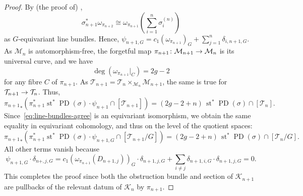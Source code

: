 \documentclass[AHL,Unicode,longabstracts]{cedram}
\makeatletter
\newcommand{\inp}[1]{\left\langle#1\right\rangle }
\newcommand{\inpr}[2]{\langle {#1},{#2} \rangle}
\newcommand{\fcll}[1]{\left[#1\right]}
\newcommand{\cl}{\colon}
\newcommand{\Mbar}{\bar{\mathcal M}}
\newcommand{\bQ}{\mathbb{Q}}
\newcommand{\cK}{\mathcal{K}}
\newcommand{\cM}{\mathcal{M}}
\newcommand{\cT}{\mathcal{T}}
\DeclareMathOperator{\pcd}{PD}
\DeclareMathOperator{\st}{st}
\renewcommand*{\to}{\mathchoice{\longrightarrow}{\rightarrow}{\rightarrow}{\rightarrow}}
\let\save@mathaccent\mathaccent
\newcommand*\if@single[3]{%
  \setbox0\hbox{${\mathaccent"0362{#1}}^H$}%
  \setbox2\hbox{${\mathaccent"0362{\kern0pt#1}}^H$}%
  \ifdim\ht0=\ht2 #3\else #2\fi
  }
\newcommand*\rel@kern[1]{\kern#1\dimexpr\macc@kerna}
\newcommand*\widebar[1]{\@ifnextchar^{{\wide@bar{#1}{0}}}{\wide@bar{#1}{1}}}
\newcommand*\wide@bar[2]{\if@single{#1}{\wide@bar@{#1}{#2}{1}}{\wide@bar@{#1}{#2}{2}}}
\newcommand*\wide@bar@[3]{%
  \begingroup
  \def\mathaccent##1##2{%
    \let\mathaccent\save@mathaccent
    \if#32 \let\macc@nucleus\first@char \fi
    \setbox\z@\hbox{$\macc@style{\macc@nucleus}_{}$}%
    \setbox\tw@\hbox{$\macc@style{\macc@nucleus}{}_{}$}%
    \dimen@\wd\tw@
    \advance\dimen@-\wd\z@
    \divide\dimen@ 3
    \@tempdima\wd\tw@
    \advance\@tempdima-\scriptspace
    \divide\@tempdima 10
    \advance\dimen@-\@tempdima
    \ifdim\dimen@>\z@ \dimen@0pt\fi
    \rel@kern{0.6}\kern-\dimen@
    \if#31
      \overline{\rel@kern{-0.6}\kern\dimen@\macc@nucleus\rel@kern{0.4}\kern\dimen@}%
      \advance\dimen@0.4\dimexpr\macc@kerna
      \let\final@kern#2%
      \ifdim\dimen@<\z@ \let\final@kern1\fi
      \if\final@kern1 \kern-\dimen@\fi
    \else
      \overline{\rel@kern{-0.6}\kern\dimen@#1}%
    \fi
  }%
  \macc@depth\@ne
  \let\math@bgroup\@empty \let\math@egroup\macc@set@skewchar
  \mathsurround\z@ \frozen@everymath{\mathgroup\macc@group\relax}%
  \macc@set@skewchar\relax
  \let\mathaccentV\macc@nested@a
  \if#31
    \macc@nested@a\relax111{#1}%
  \else
    \def\gobble@till@marker##1\endmarker{}%
    \futurelet\first@char\gobble@till@marker#1\endmarker
    \ifcat\noexpand\first@char A\else
      \def\first@char{}%
    \fi
    \macc@nested@a\relax111{\first@char}%
  \fi
  \endgroup
}
\let\oldbar\bar
\renewcommand*{\bar}[1]{{\mathchoice{\widebar{#1}}{\widebar{#1}}{\widebar{#1}}{\oldbar{#1}}}}
\let\oldin\in
\renewcommand{\in}{\mathchoice{\oldin}{\oldin}{\,\oldin\,}{\,\oldin\,}}
\makeatother
\begin{document}
\begin{proof}
By (the proof of) \cite[Lemma~VI.3.7.2]{Ma99},
\begin{equation}\label{eq:line-bundles-agree}
\sigma_{n+1}^*\omega_{\pi_{n+2}}\cong \omega_{\pi_{n+1}}\left(\sum_{i=1}^n\sigma^{(n)}_{i}\right)
\end{equation}
as $G$-equivariant line bundles. Hence, $\psi_{n+1,G} = c_1(\omega_{\pi_{n+1}})_G + \sum_{j=1}^n\delta_{i,n+1,G}$. As $\cM_n$ is automorphism-free, the forgetful map $\pi_{n+1}\cl \cM_{n+1}\to \cM_n$ is its universal curve, and we have
\[
\deg(\omega_{\pi_{n+1}}|_C) = 2g-2
\]
for any fibre $C$ of $\pi_{n+1}$. As $\cT_{n+1} = \cT_n\times_{\cM_{n}}\cM_{n+1}$, the same is true for $\cT_{n+1}\to \cT_n$. Thus,
\[
{\pi_{n+1}}_*\left(\pi_{n+1}^*\st^*\pcd(\sigma)\cdot\psi_{n+1}\cap \fcll{\cT_{n+1}}\right) = (2g-2+n)\,\st^*\pcd(\sigma)\cap \fcll{\cT_n}.
\]
Since~\eqref{eq:line-bundles-agree} is an equivariant isomorphism, we obtain the same equality in equivariant cohomology, and thus on the level of the quotient spaces:
\begin{equation*}\label{eq:dil-eq-1}
{\pi_{n+1}}_*\left(\pi_{n+1}^*\st^*\pcd(\sigma)\cdot\psi_{n+1,G}\cap \fcll{\cT_{n+1}/G}\right) = (2g-2+n)\,\st^*\pcd(\sigma)\cap\fcll{\cT_n/G}.
\end{equation*}
All other terms vanish because
\[
\psi_{n+1,G}\cdot \delta_{n+,j,G} = c_1(\omega_{\pi_{n+1}}(D_{n+1,j}))_G\cdot \delta_{n+1,j,G} + \sum_{i\neq j}\delta_{n+1,i,G}\cdot \delta_{n+1,j,G} = 0.
\]
This completes the proof since both the obstruction bundle and section of $\cK_{n+1}$ are pullbacks of the relevant datum of $\cK_n$ by $\pi_{n+1}$.
\end{proof}

\end{document}
